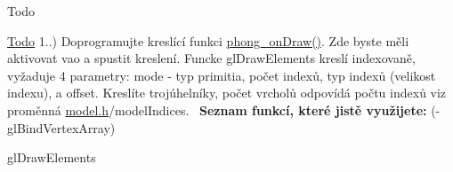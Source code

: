 \begin{DoxyRefDesc}{Todo}
\item[\hyperlink{todo__todo000008}{Todo}]1..) Doprogramujte kreslící funkci \hyperlink{student_8h_a53ffbb1a271d285abdaf7a029192f47e}{phong\+\_\+on\+Draw()}. Zde byste měli aktivovat vao a spustit kreslení. Funcke gl\+Draw\+Elements kreslí indexovaně, vyžaduje 4 parametry\+: mode -\/ typ primitia, počet indexů, typ indexů (velikost indexu), a offset. Kreslíte trojúhelníky, počet vrcholů odpovídá počtu indexů viz proměnná \hyperlink{model_8h}{model.\+h}/model\+Indices.~\newline
 {\bfseries Seznam funkcí, které jistě využijete\+:} (-\/ gl\+Bind\+Vertex\+Array)
\begin{DoxyItemize}
\item gl\+Draw\+Elements 
\end{DoxyItemize}\end{DoxyRefDesc}
